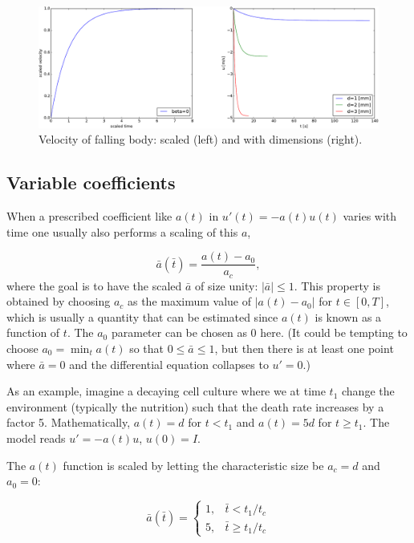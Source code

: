 \documentclass[graybox,envcountchap,sectrefs,final]{svmonodo}
\begin{document}
\begin{figure}[!ht]  %
  \centerline{\includegraphics[width=1.0\linewidth]{fig-scaling/falling_body.pdf}}
  \caption{
  Velocity of falling body: scaled (left) and with dimensions (right). \label{sec:scale:body:fig}
  }
\end{figure}



\subsection{Variable coefficients}
\label{sec:scale:jump}

When a prescribed coefficient like $a(t)$ in $u'(t) = -a(t)u(t)$
varies with time one usually also
performs a scaling of this $a$,

\[ \bar a(\bar t) = \frac{a(t) - a_0}{a_c}, \]
where the goal is to have the scaled $\bar a$
of size unity: $|\bar a|\leq 1$.
This property is obtained by choosing $a_c$ as the maximum value
of $|a(t)-a_0|$ for $t\in [0,T]$, which is usually a quantity that
can be estimated since $a(t)$ is known as a function of $t$. The $a_0$
parameter can be chosen as 0 here. (It could be tempting to
choose $a_0=\min_t a(t)$ so that $0\leq \bar a\leq 1$, but then there
is at least one point where $\bar a = 0$ and
the differential equation collapses to $u'=0$.)

As an example, imagine a decaying cell culture where we at time $t_1$
change the environment (typically the nutrition)
such that the death rate increases by a factor 5.
Mathematically, $a(t) = d$ for
$t < t_1$ and $a(t)=5d$ for $t\geq t_1$. The model reads $u'=-a(t)u$, $u(0)=I$.

The $a(t)$ function is scaled by letting the characteristic size be
$a_c=d$ and $a_0=0$:

\[ \bar a (\bar t) = \left\lbrace\begin{array}{ll}
1, & \bar t < t_1/t_c\\ 
5, & \bar t \geq t_1/t_c
\end{array}\right.
\]
\end{document}
